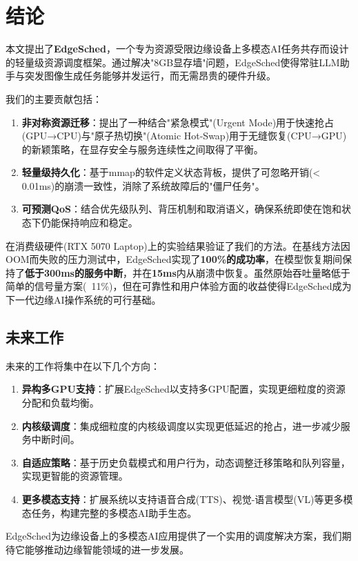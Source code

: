 \section{结论}

本文提出了\textbf{EdgeSched}，一个专为资源受限边缘设备上多模态AI任务共存而设计的轻量级资源调度框架。通过解决"8GB显存墙"问题，EdgeSched使得常驻LLM助手与突发图像生成任务能够并发运行，而无需昂贵的硬件升级。

我们的主要贡献包括：
\begin{enumerate}
\item \textbf{非对称资源迁移}：提出了一种结合"紧急模式"(Urgent Mode)用于快速抢占(GPU→CPU)与"原子热切换"(Atomic Hot-Swap)用于无缝恢复(CPU→GPU)的新颖策略，在显存安全与服务连续性之间取得了平衡。

\item \textbf{轻量级持久化}：基于mmap的软件定义状态背板，提供了可忽略开销(< 0.01ms)的崩溃一致性，消除了系统故障后的"僵尸任务"。

\item \textbf{可预测QoS}：结合优先级队列、背压机制和取消语义，确保系统即使在饱和状态下仍能保持响应和稳定。
\end{enumerate}

在消费级硬件(RTX 5070 Laptop)上的实验结果验证了我们的方法。在基线方法因OOM而失败的压力测试中，EdgeSched实现了\textbf{100\%的成功率}，在模型恢复期间保持了\textbf{低于300ms的服务中断}，并在\textbf{15ms}内从崩溃中恢复。虽然原始吞吐量略低于简单的信号量方案(~11\%)，但在可靠性和用户体验方面的收益使得EdgeSched成为下一代边缘AI操作系统的可行基础。

\subsection{未来工作}

未来的工作将集中在以下几个方向：

\begin{enumerate}
\item \textbf{异构多GPU支持}：扩展EdgeSched以支持多GPU配置，实现更细粒度的资源分配和负载均衡。

\item \textbf{内核级调度}：集成细粒度的内核级调度以实现更低延迟的抢占，进一步减少服务中断时间。

\item \textbf{自适应策略}：基于历史负载模式和用户行为，动态调整迁移策略和队列容量，实现更智能的资源管理。

\item \textbf{更多模态支持}：扩展系统以支持语音合成(TTS)、视觉-语言模型(VL)等更多模态任务，构建完整的多模态AI助手生态。
\end{enumerate}

EdgeSched为边缘设备上的多模态AI应用提供了一个实用的调度解决方案，我们期待它能够推动边缘智能领域的进一步发展。
